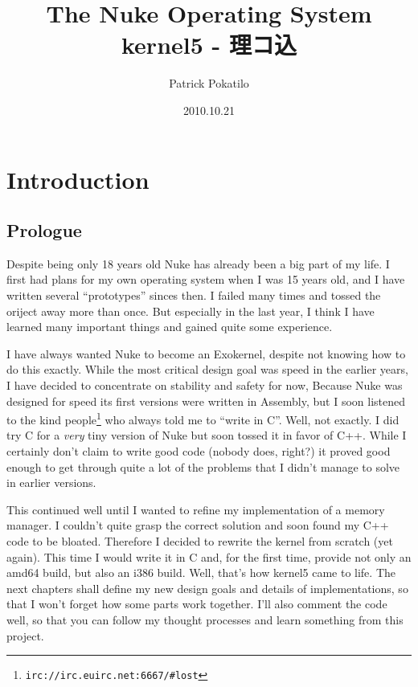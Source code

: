 \documentclass[a4paper,openany]{scrbook}
\title{The Nuke Operating System\\kernel5 - 理コ込}
\author{Patrick Pokatilo}
\date{2010.10.21}
\begin{document}
\pagestyle{fancy}
\setlength{\oddsidemargin}{0mm}
\setlength{\evensidemargin}{0mm}
\setlength{\textwidth}{159.2mm}
\setlength{\parskip}{\medskipamount}
\setlength{\parindent}{0mm}

\begin{titlepage}
\maketitle
\end{titlepage}

\tableofcontents

\part{Introduction}
\chapter{Prologue}
Despite being only 18 years old Nuke has already been a big part of
my life. I first had plans for my own operating system when I was
15 years old, and I have written several ``prototypes'' sinces then.
I failed many times and tossed the oriject away more than once. But
especially in the last year, I think I have learned many important
things and gained quite some experience.

I have always wanted Nuke to become an Exokernel, despite not knowing
how to do this exactly. While the most critical design goal was speed
in the earlier years, I have decided to concentrate on stability and
safety for now, Because Nuke was designed for speed its first versions
were written in Assembly, but I soon listened to
the kind people\footnote{\tt{irc://irc.euirc.net:6667/\#lost}}
who always told me to ``write in C''. Well, not exactly. I did try
C for a \textsl{very} tiny version of Nuke but soon tossed it in favor
of C++. While I certainly don't claim to write good code (nobody does,
right?) it proved good enough to get through quite a lot of the problems
that I didn't manage to solve in earlier versions.

This continued well until I wanted to refine my implementation of
a memory manager. I couldn't quite grasp the correct solution and
soon found my C++ code to be bloated. Therefore I decided to rewrite
the kernel from scratch (yet again). This time I would write it in C and, for
the first time, provide not only an amd64 build, but also an i386 build.
Well, that's how kernel5 came to life. The next chapters shall define
my new design goals and details of implementations, so that I won't
forget how some parts work together. I'll also comment the code well,
so that you can follow my thought processes and learn something from
this project.
\end{document}
